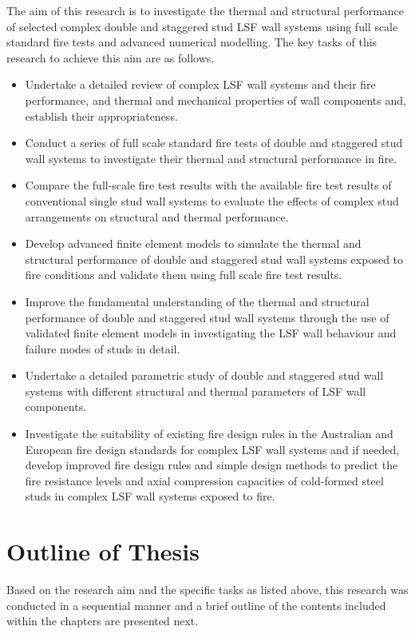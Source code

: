 The aim of this research is to investigate the thermal and structural performance of selected complex double and staggered stud LSF wall systems using full scale standard fire tests and advanced numerical modelling. The key tasks of this research to achieve this aim are as follows. 
\begin{itemize}
	\item Undertake a detailed review of complex LSF wall systems and their fire performance, and thermal and mechanical properties of wall components and, establish their appropriateness.
	\item Conduct a series of full scale standard fire tests of double and staggered stud wall systems to investigate their thermal and structural performance in fire. 
	\item Compare the full-scale fire test results with the available fire test results of conventional single stud wall systems to evaluate the effects of complex stud arrangements on structural and thermal performance.  
	\item Develop advanced finite element models to simulate the thermal and structural performance of double and staggered stud wall systems exposed to fire conditions and validate them using full scale fire test results.
	\item Improve the fundamental understanding of the thermal and structural performance of double and staggered stud wall systems through the use of validated finite element models in investigating the LSF wall behaviour and failure modes of studs in detail.
	\item Undertake a detailed parametric study of double and staggered stud wall systems with different structural and thermal parameters of LSF wall components. 
	\item Investigate the suitability of existing fire design rules in the Australian and European fire design standards for complex LSF wall systems and if needed, develop improved fire design rules and simple design methods to predict the fire resistance levels and axial compression capacities of cold-formed steel studs in complex LSF wall systems exposed to fire.
\end{itemize}

\section{Outline of Thesis}

Based on the research aim and the specific tasks as listed above, this research was conducted in a sequential manner and a brief outline of the contents included within the chapters are presented next.

